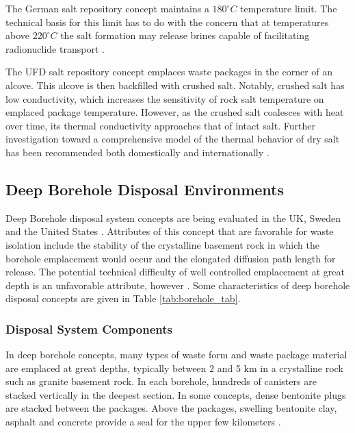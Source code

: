The German salt repository concept maintains a $180^\circ C$ temperature limit. 
The technical basis for this limit has to do with the concern that at
temperatures above $220^\circ C$ the salt formation may release brines capable 
of facilitating radionuclide transport 
\cite{von_lensa_red-impact_2008, brewitz_long-term_2002}.

The \gls{UFD} salt repository concept emplaces waste packages in the corner of 
an alcove. This alcove is then backfilled with crushed salt. Notably, crushed 
salt has low conductivity, which increases the sensitivity of rock salt 
temperature on emplaced package temperature. However, as the crushed salt 
coalesces with heat over time, its thermal conductivity approaches that of 
intact salt. Further investigation toward a comprehensive model of the thermal 
behavior of dry salt has been recommended both domestically and internationally 
\cite{carter_disposal_2011}. 


\subsection{Deep Borehole Disposal Environments}

Deep Borehole disposal system concepts are being evaluated in the UK, 
Sweden and the United States \cite{von_lensa_red-impact_2008, 
clayton_generic_2011}. Attributes of this concept that are 
favorable for waste isolation include the stability of the crystalline 
basement rock in which the borehole emplacement would occur and the elongated
diffusion path length for release. The potential technical difficulty of well 
controlled emplacement at great depth is an unfavorable attribute, however 
\cite{hardin_generic_2011}.  Some characteristics of deep borehole disposal 
concepts are given in Table \ref{tab:borehole_tab}.   



\subsubsection{Disposal System Components}

In deep borehole concepts, many types of  waste form and waste package material 
are emplaced at great depths, typically between 2 and 5 km 
\cite{hardin_generic_2011, clayton_generic_2011}
in a crystalline rock such as granite basement rock. In each borehole, hundreds
of canisters are stacked vertically in the deepest section. In some concepts, 
dense bentonite plugs are stacked between the packages. Above the packages, 
swelling bentonite clay, asphalt and concrete provide a seal for the upper few 
kilometers \cite{clayton_generic_2011}. 

